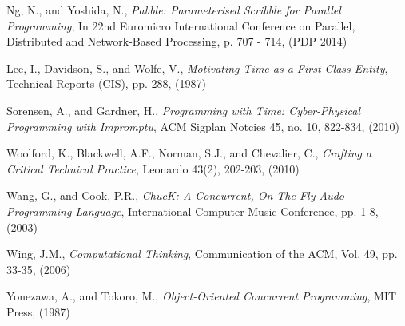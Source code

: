 \documentclass[11pt]{scrartcl}
\begin{document}
\begin{thebibliography}{9}
  Ng, N., and Yoshida, N.,
  \emph{Pabble: Parameterised Scribble for Parallel Programming},
  In 22nd Euromicro International Conference on Parallel, Distributed and Network-Based Processing, 
  p. 707 - 714,
  (PDP 2014)

  Lee, I., Davidson, S., and Wolfe, V.,
  \emph{Motivating Time as a First Class Entity},
  Technical Reports (CIS),
  pp. 288,
  (1987)

  Sorensen, A., and Gardner, H.,
  \emph{Programming with Time: Cyber-Physical Programming with Impromptu},
  ACM Sigplan Notcies 45,
  no. 10, 822-834,
  (2010)

  Woolford, K., Blackwell, A.F., Norman, S.J., and Chevalier, C.,
  \emph{Crafting a Critical Technical Practice},
  Leonardo 43(2),
  202-203,
  (2010)

  Wang, G., and Cook, P.R.,
  \emph{ChucK: A Concurrent, On-The-Fly Audo Programming Language},
  International Computer Music Conference,
  pp. 1-8,
  (2003)

  Wing, J.M.,
  \emph{Computational Thinking},
  Communication of the ACM,
  Vol. 49, pp. 33-35,
  (2006)

  Yonezawa, A., and Tokoro, M.,
  \emph{Object-Oriented Concurrent Programming},
  MIT Press,
  (1987)

\end{thebibliography}
\end{document}
